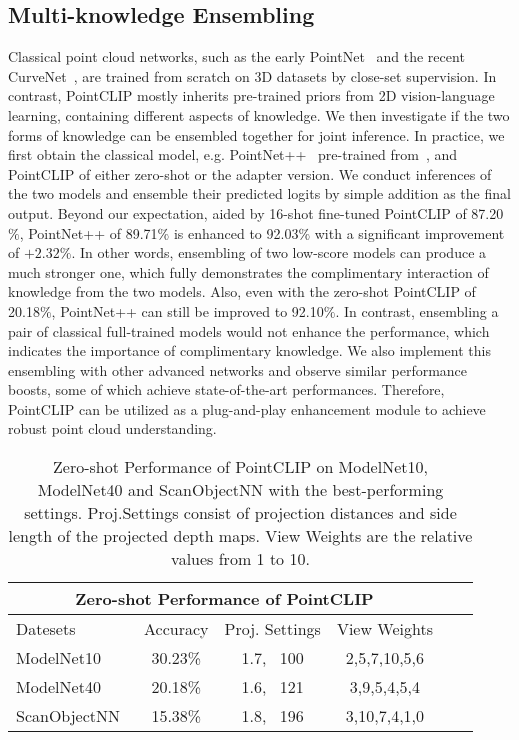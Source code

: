 \documentclass[10pt,twocolumn,letterpaper]{article}
\begin{document}
\vspace*{1pt}
\subsection{Multi-knowledge Ensembling}
\label{m-ensemble}
Classical point cloud networks, such as the early PointNet~\cite{qi2017pointnet} and the recent CurveNet~\cite{muzahid2020curvenet}, are trained from scratch on 3D datasets by close-set supervision. In contrast, PointCLIP mostly inherits pre-trained priors from 2D vision-language learning, containing different aspects of knowledge. We then investigate if the two forms of knowledge can be ensembled together for joint inference. In practice, we first obtain the classical model, e.g. PointNet++~\cite{qi2017pointnet++} pre-trained from~\cite{simpleview2021}, and PointCLIP of either zero-shot or the adapter version. We conduct inferences of the two models and ensemble their predicted logits by simple addition as the final output. Beyond our expectation, aided by 16-shot fine-tuned PointCLIP of 87.20$\%$, PointNet++ of 89.71$\%$ is enhanced to 92.03$\%$ with a significant improvement of $+2.32\%$. In other words, ensembling of two low-score models can produce a much stronger one, which fully demonstrates the complimentary interaction of knowledge from the two models. Also, even with the zero-shot PointCLIP of 20.18$\%$, PointNet++ can still be improved to 92.10$\%$. In contrast, ensembling a pair of classical full-trained models would not enhance the performance, which indicates the importance of complimentary knowledge. We also implement this ensembling with other advanced networks and observe similar performance boosts, some of which achieve state-of-the-art performances. Therefore, PointCLIP can be utilized as a plug-and-play enhancement module to achieve robust point cloud understanding.


\begin{table}[t]
\centering
\begin{adjustbox}{width=\linewidth}
	\begin{tabular}{lccccc}
	\toprule
		\multicolumn{4}{c}{Zero-shot Performance of PointCLIP} \\ \midrule
		Datesets &Accuracy &Proj. Settings &View Weights \\
		\cmidrule(lr){1-1} \cmidrule(lr){2-2} \cmidrule(lr){3-3} \cmidrule(lr){4-4}
	    ModelNet10~\cite{wu20153d} &30.23\% &1.7, \ 100 & 2,5,7,10,5,6\\
	    ModelNet40~\cite{wu20153d}  &20.18\% &1.6, \ 121 &3,9,5,4,5,4\\
	    ScanObjectNN~\cite{uy2019revisiting} &15.38\% &1.8, \ 196 &3,10,7,4,1,0\\
	\bottomrule
	\end{tabular}
\end{adjustbox}
\caption{Zero-shot Performance of PointCLIP on ModelNet10, ModelNet40 and ScanObjectNN with the best-performing settings. Proj.Settings consist of projection distances and side length of the projected depth maps. View Weights are the relative values from 1 to 10.}
\vspace*{-7.4pt}
\label{zero-exp}
\end{table}
\end{document}
